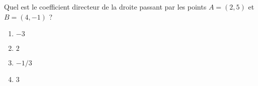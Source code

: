 
\begin{exercice}\label{exosmath-0394}

    Quel est le coefficient directeur de la droite passant par les points \( A=(2,5)\) et \( B=(4,-1)\) ?
    \begin{multicols}{2}
        \begin{enumerate}
            \item
                \( -3\)
            \item
                \( 2\)
            \item
                \( -1/3\)
            \item
                \( 3\)
        \end{enumerate}
    \end{multicols}


\end{exercice}
